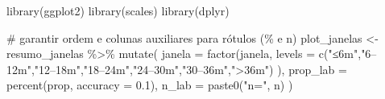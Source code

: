 \documentclass[
]{article}
\newenvironment{Shaded}{\begin{snugshade}}{\end{snugshade}}
\newcommand{\AttributeTok}[1]{\textcolor[rgb]{0.40,0.45,0.13}{#1}}
\newcommand{\CommentTok}[1]{\textcolor[rgb]{0.37,0.37,0.37}{#1}}
\newcommand{\FloatTok}[1]{\textcolor[rgb]{0.68,0.00,0.00}{#1}}
\newcommand{\FunctionTok}[1]{\textcolor[rgb]{0.28,0.35,0.67}{#1}}
\newcommand{\NormalTok}[1]{\textcolor[rgb]{0.00,0.23,0.31}{#1}}
\newcommand{\OtherTok}[1]{\textcolor[rgb]{0.00,0.23,0.31}{#1}}
\newcommand{\SpecialCharTok}[1]{\textcolor[rgb]{0.37,0.37,0.37}{#1}}
\newcommand{\StringTok}[1]{\textcolor[rgb]{0.13,0.47,0.30}{#1}}
\begin{document}
\begin{Shaded}
\begin{Highlighting}[]
\FunctionTok{library}\NormalTok{(ggplot2)}
\FunctionTok{library}\NormalTok{(scales)}
\FunctionTok{library}\NormalTok{(dplyr)}

\CommentTok{\# garantir ordem e colunas auxiliares para rótulos (\% e n)}
\NormalTok{plot\_janelas }\OtherTok{\textless{}{-}}\NormalTok{ resumo\_janelas }\SpecialCharTok{\%\textgreater{}\%}
  \FunctionTok{mutate}\NormalTok{(}
    \AttributeTok{janela =} \FunctionTok{factor}\NormalTok{(janela,}
      \AttributeTok{levels =} \FunctionTok{c}\NormalTok{(}\StringTok{"≤6m"}\NormalTok{,}\StringTok{"6–12m"}\NormalTok{,}\StringTok{"12–18m"}\NormalTok{,}\StringTok{"18–24m"}\NormalTok{,}\StringTok{"24–30m"}\NormalTok{,}\StringTok{"30–36m"}\NormalTok{,}\StringTok{"\textgreater{}36m"}\NormalTok{)}
\NormalTok{    ),}
    \AttributeTok{prop\_lab =} \FunctionTok{percent}\NormalTok{(prop, }\AttributeTok{accuracy =} \FloatTok{0.1}\NormalTok{),}
    \AttributeTok{n\_lab =} \FunctionTok{paste0}\NormalTok{(}\StringTok{"n="}\NormalTok{, n)}
\NormalTok{  )}


\end{Highlighting}
\end{Shaded}
\end{document}
